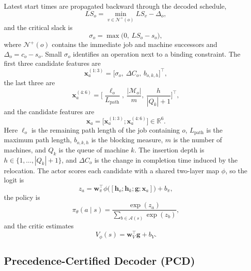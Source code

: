 \documentclass[conference]{IEEEtran}
\theoremstyle{remark}
\newcommand{\cN}{\mathcal{N}}
\newcommand{\cA}{\mathcal{A}}
\newcommand{\cM}{\mathcal{M}}
\begin{document}
Latest start times are propagated backward through the decoded schedule,
\begin{equation}
LS_o=\min_{v\in\cN^{+}(o)}LS_v-\Delta_o,
\label{eq:S-lateststart}
\end{equation}
and the critical slack is
\begin{equation}
\sigma_o=\max\big(0,\ LS_o-s_o\big),
\label{eq:S-slack}
\end{equation}
where $\cN^{+}(o)$ contains the immediate job and machine successors and $\Delta_o=c_o-s_o$. Small $\sigma_o$ identifies an operation next to a binding constraint. The first three candidate features are
\begin{equation}
\bm{x}_a^{(1:3)}=\big[\sigma_o,\ \Delta C_o,\ b_{o,k,h}\big]^{\top},
\label{eq:S-candidate1}
\end{equation}
the last three are
\begin{equation}
\bm{x}_a^{(4:6)}=\Big[\frac{\ell_o}{L_{\mathrm{path}}},\ \frac{|\cM_o|}{m},\ \frac{h}{|Q_k|+1}\Big]^{\top},
\label{eq:S-candidate2}
\end{equation}
and the candidate features are
\begin{equation}
\bm{x}_a=\big[\bm{x}_a^{(1:3)};\bm{x}_a^{(4:6)}\big]\in\mathbb{R}^{6}.
\label{eq:S-candidate}
\end{equation}
Here $\ell_o$ is the remaining path length of the job containing $o$, $L_{\mathrm{path}}$ is the maximum path length, $b_{o,k,h}$ is the blocking measure, $m$ is the number of machines, and $Q_k$ is the queue of machine $k$. The insertion depth is $h\in\{1,\dots,|Q_k|+1\}$, and $\Delta C_o$ is the change in completion time induced by the relocation.
The actor scores each candidate with a shared two-layer map $\phi$, so the logit is
\begin{equation}
z_a=\bm{w}_\pi^{\top}\phi\big([\bm{h}_o;\bm{h}_k;\bm{g};\bm{x}_a]\big)+b_\pi,
\label{eq:S-score2}
\end{equation}
the policy is
\begin{equation}
\pi_\theta(a\mid s)=\frac{\exp(z_a)}{\sum_{b\in\cA(s)}\exp(z_b)},
\label{eq:S-policy}
\end{equation}
and the critic estimates
\begin{equation}
V_\phi(s)=\bm{w}_V^{\top}\bm{g}+b_V.
\label{eq:S-value}
\end{equation}

\subsection{Precedence-Certified Decoder (PCD)}
\label{sec:S-decoder}
\end{document}
